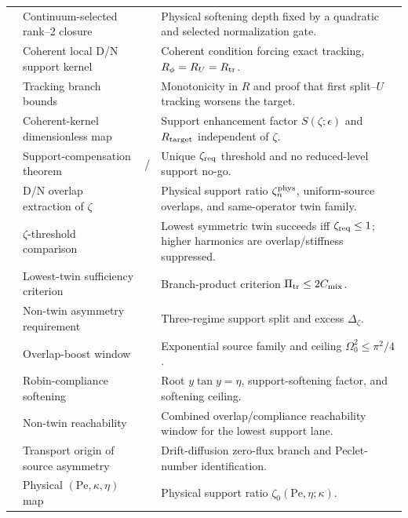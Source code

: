 \begin{longtable}{@{}L{0.09\textwidth}L{0.30\textwidth}L{0.20\textwidth}L{0.35\textwidth}@{}}
 & Continuum-selected rank--2 closure & \StatusExactClosure{} & Physical softening depth fixed by a quadratic and selected normalization gate. \\
 & Coherent local D/N support kernel & \StatusExactClosure{} & Coherent condition forcing exact tracking, \(R_\phi=R_U=R_{\rm tr}\). \\
 & Tracking branch bounds & \StatusExactClosure{} & Monotonicity in \(R\) and proof that first split--\(U\) tracking worsens the target. \\
 & Coherent-kernel dimensionless map & \StatusExactClosure{} & Support enhancement factor \(S(\zeta;\epsilon)\) and \(R_{\rm target}\) independent of \(\zeta\). \\
 & Support-compensation theorem & \StatusExactClosure{} / \StatusOpen{} & Unique \(\zeta_{\rm req}\) threshold and no reduced-level support no-go. \\
 & D/N overlap extraction of \(\zeta\) & \StatusExactClosure{} & Physical support ratio \(\zeta_n^{\rm phys}\), uniform-source overlaps, and same-operator twin family. \\
 & \(\zeta\)-threshold comparison & \StatusExactClosure{} & Lowest symmetric twin succeeds iff \(\zeta_{\rm req}\leq1\); higher harmonics are overlap/stiffness suppressed. \\
 & Lowest-twin sufficiency criterion & \StatusExactClosure{} & Branch-product criterion \(\Pi_{\rm tr}\leq2C_{\rm mix}\). \\
 & Non-twin asymmetry requirement & \StatusExactClosure{} & Three-regime support split and excess \(\Delta_\zeta\). \\
 & Overlap-boost window & \StatusExactClosure{} & Exponential source family and ceiling \(\Omega_0^2\leq\pi^2/4\). \\
 & Robin-compliance softening & \StatusExactClosure{} & Root \(y\tan y=\eta\), support-softening factor, and softening ceiling. \\
 & Non-twin reachability & \StatusExactClosure{} & Combined overlap/compliance reachability window for the lowest support lane. \\
 & Transport origin of source asymmetry & \StatusExactClosure{} & Drift-diffusion zero-flux branch and Peclet-number identification. \\
 & Physical \((\mathrm{Pe},\kappa,\eta)\) map & \StatusExactClosure{} & Physical support ratio \(\zeta_0(\mathrm{Pe},\eta;\kappa)\). \\

\end{longtable}
